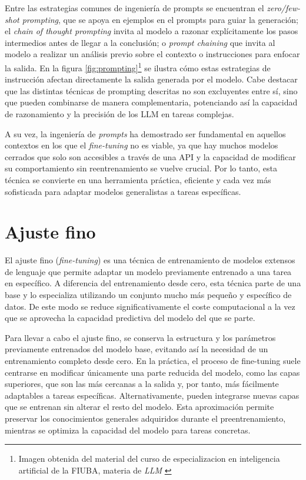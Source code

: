 Entre las estrategias comunes de ingeniería de prompts se encuentran el \textit{zero/few-shot prompting}\cite{brown2020language,kojima2022large}, que se apoya en 
ejemplos en el prompts para guiar la generación; el \textit{chain of thought prompting}\cite{wei2022chain} invita al modelo a razonar explícitamente
los pasos intermedios antes de llegar a la conclusión; o \textit{prompt chaining}\cite{promptchaining2023} que invita al modelo a realizar un análisis previo
sobre el contexto o instrucciones para enfocar la salida.
En la figura \ref{fig:prompting}\footnote{
	Imagen obtenida del material del curso de especializacion en inteligencia artificial de la FIUBA,
	materia de \textit{LLM} \cite{fiubaPrompt} 
	} se ilustra cómo estas estrategias de instrucción afectan directamente la salida generada por el modelo.
Cabe destacar que las distintas técnicas de prompting descritas no son excluyentes entre sí,
sino que pueden combinarse de manera complementaria, potenciando así la capacidad de razonamiento
y la precisión de los LLM en tareas complejas.

A su vez, la ingeniería de \textit{prompts} ha demostrado ser fundamental en aquellos contextos en los que
el \textit{fine-tuning} no es viable, ya que hay muchos modelos cerrados que solo son accesibles a través de una API
y la capacidad de modificar su comportamiento sin reentrenamiento se vuelve crucial.
Por lo tanto, esta técnica se convierte en una herramienta práctica, eficiente y cada vez más sofisticada
para adaptar modelos generalistas a tareas específicas.


\section{Ajuste fino}
El ajuste fino (\textit{fine-tuning})\cite{howard2018universal} es una técnica de entrenamiento de modelos extensos de lenguaje 
que permite adaptar un modelo previamente entrenado a una tarea en específico.
A diferencia del entrenamiento desde cero, esta técnica parte de una base
y lo especializa utilizando un conjunto mucho más pequeño y específico de datos.
De este modo se reduce significativamente el coste computacional a la vez que se aprovecha
la capacidad predictiva del modelo del que se parte.

Para llevar a cabo el ajuste fino, se conserva la estructura y los parámetros previamente entrenados del modelo base,
evitando así la necesidad de un entrenamiento completo desde cero.
En la práctica, el proceso de fine-tuning suele centrarse en modificar únicamente una parte reducida del modelo,
como las capas superiores, que son las más cercanas a la salida y, por tanto,
más fácilmente adaptables a tareas específicas.
Alternativamente, pueden integrarse nuevas capas que se entrenan sin alterar el resto del modelo.
Esta aproximación permite preservar los conocimientos generales adquiridos durante el preentrenamiento,
mientras se optimiza la capacidad del modelo para tareas concretas.

